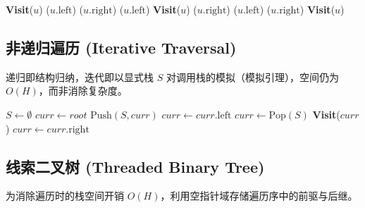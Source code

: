 \begin{algorithm}[H]
\caption{二叉树递归遍历伪代码 (Binary Tree Traversal)}
\begin{algorithmic}[1]
 
     \State \Return \EndIf
    \State \textbf{Visit}($u$)
    \State {}($u.\text{left}$)
    \State {}($u.\text{right}$)
\EndProcedure
{} 
     \State \Return \EndIf
    \State {}($u.\text{left}$)
    \State \textbf{Visit}($u$)
    \State {}($u.\text{right}$)
\EndProcedure
{} 
     \State \Return \EndIf
    \State {}($u.\text{left}$)
    \State {}($u.\text{right}$)
    \State \textbf{Visit}($u$)
\EndProcedure
\end{algorithmic}
\end{algorithm}

\subsection{非递归遍历 (Iterative Traversal)}

递归即结构归纳，迭代即以显式栈 $S$ 对调用栈的模拟（模拟引理），空间仍为 $O(H)$，而非消除复杂度。

\begin{algorithm}[H]
\caption{中序遍历迭代伪代码 (Iterative Inorder)}
\begin{algorithmic}[1]
    \State $S \gets \emptyset$ 
    \State $curr \gets root$
            \State $\text{Push}(S, curr)$
            \State $curr \gets curr.\text{left}$
        \EndWhile
        \State $curr \gets \text{Pop}(S)$
        \State \textbf{Visit}($curr$)
        \State $curr \gets curr.\text{right}$
    \EndWhile
\EndProcedure
\end{algorithmic}
\end{algorithm}

\subsection{线索二叉树 (Threaded Binary Tree)}

为消除遍历时的栈空间开销 $O(H)$，利用空指针域存储遍历序中的前驱与后继。

